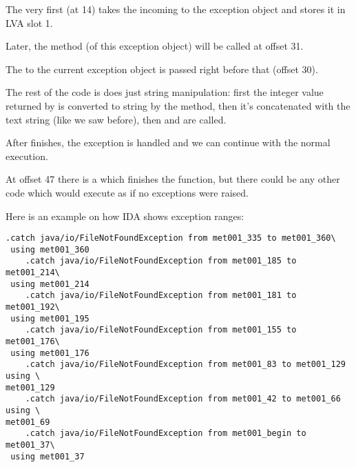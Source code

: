 The very first  (at 14) takes the incoming  to the exception object 
and stores it in \ac{LVA} slot 1.

Later, the  method (of this exception object) will be called at offset 31.

The  to the current exception object is passed right before that (offset 30).

The rest of the code is does just string manipulation: 
first the integer value returned by 
is converted to string by the  method, then it's concatenated with 
the  text string (like we saw before),
then  and  are called.

After  finishes, the exception is handled and we can continue with the normal execution.

At offset 47 there is a  which finishes the \main function, 
but there could be any other code which would execute as if no exceptions were raised.

Here is an example on how IDA shows exception ranges:


\begin{lstlisting}[caption=from some random .class file found on the author's computer]
    .catch java/io/FileNotFoundException from met001_335 to met001_360\
 using met001_360
    .catch java/io/FileNotFoundException from met001_185 to met001_214\
 using met001_214
    .catch java/io/FileNotFoundException from met001_181 to met001_192\
 using met001_195
    .catch java/io/FileNotFoundException from met001_155 to met001_176\
 using met001_176
    .catch java/io/FileNotFoundException from met001_83 to met001_129 using \
met001_129
    .catch java/io/FileNotFoundException from met001_42 to met001_66 using \
met001_69
    .catch java/io/FileNotFoundException from met001_begin to met001_37\
 using met001_37
\end{lstlisting}
